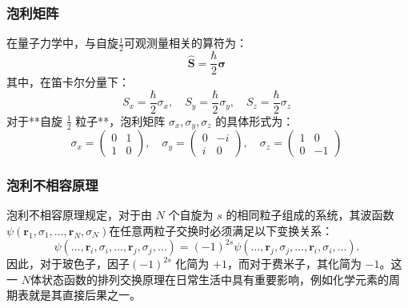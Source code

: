 \subsubsection{泡利矩阵}  
在量子力学中，与自旋\(\frac{1}{2}\)可观测量相关的算符为：  
\[
\hat{\mathbf{S}} = \frac{\hbar}{2} \boldsymbol{\sigma}~
\]  
其中，在笛卡尔分量下：  
\[
S_x = \frac{\hbar}{2} \sigma_x, \quad S_y = \frac{\hbar}{2} \sigma_y, \quad S_z = \frac{\hbar}{2} \sigma_z~
\]  
对于**自旋 \( \frac{1}{2} \) 粒子**，泡利矩阵 \( \sigma_x, \sigma_y, \sigma_z \) 的具体形式为：  
\[
\sigma_x = \begin{pmatrix} 0 & 1 \\ 1 & 0 \end{pmatrix}, \quad  
\sigma_y = \begin{pmatrix} 0 & -i \\ i & 0 \end{pmatrix}, \quad  
\sigma_z = \begin{pmatrix} 1 & 0 \\ 0 & -1 \end{pmatrix}~
\]  
\subsubsection{泡利不相容原理 }
泡利不相容原理规定，对于由 \( N \) 个自旋为 \( s \) 的相同粒子组成的系统，其波函数\(\psi (\mathbf{r}_1, \sigma_1, \dots , \mathbf{r}_N, \sigma_N)\)在任意两粒子交换时必须满足以下变换关系：  
\[
\psi (\dots ,\mathbf{r}_i, \sigma_i, \dots ,\mathbf{r}_j, \sigma_j, \dots ) = (-1)^{2s} \psi (\dots ,\mathbf{r}_j, \sigma_j, \dots ,\mathbf{r}_i, \sigma_i, \dots ).~
\]  
因此，对于玻色子，因子\( (-1)^{2s} \) 化简为 \( +1 \)，而对于费米子，其化简为 \( -1 \)。这一 \( N \)体状态函数的排列交换原理在日常生活中具有重要影响，例如化学元素的周期表就是其直接后果之一。
